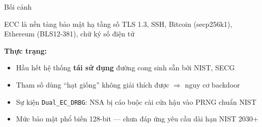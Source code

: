 \begin{frame}[label=sec1]{Bối cảnh}
  \begin{block}{ECC là nền tảng bảo mật hạ tầng số}
    TLS 1.3, SSH, Bitcoin (secp256k1), Ethereum (BLS12-381), chữ ký số điện tử
  \end{block}
  \vspace{0.4em}
  \textbf{Thực trạng:}
  \begin{itemize}
    \item Hầu hết hệ thống \textbf{tái sử dụng} đường cong sinh sẵn bởi NIST, SECG
    \item Tham số dùng ``hạt giống'' không giải thích được $\Rightarrow$ nguy cơ backdoor
    \item Sự kiện \texttt{Dual\_EC\_DRBG}: NSA bị cáo buộc cài cửa hậu vào PRNG chuẩn NIST
    \item Mức bảo mật phổ biến 128-bit --- chưa đáp ứng yêu cầu dài hạn NIST 2030+
  \end{itemize}
\end{frame}
